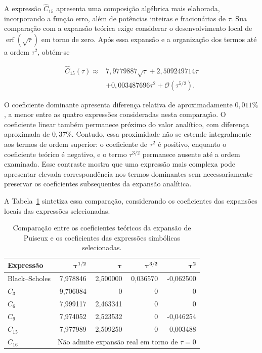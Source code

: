 A expressão $\widehat{C}_{15}$ apresenta uma composição algébrica mais elaborada, incorporando a função erro, além de potências inteiras e fracionárias de $\tau$. Sua comparação com a expansão teórica exige considerar o desenvolvimento local de $\operatorname{erf}(\sqrt{\tau})$ em torno de zero. Após essa expansão e a organização dos termos até a ordem $\tau^2$, obtém-se

\begin{equation}
\begin{aligned}
\widehat{C}_{15}(\tau)\approx{}&
7{,}9779887\sqrt{\tau}
+2{,}509249714\tau\\
&+0{,}003487696\tau^2
+\mathcal{O}(\tau^{5/2}).
\end{aligned}
\end{equation}

O coeficiente dominante apresenta diferença relativa de aproximadamente $0{,}011\%$, a menor entre as quatro expressões consideradas nesta comparação. O coeficiente linear também permanece próximo do valor analítico, com diferença aproximada de $0{,}37\%$. Contudo, essa proximidade não se estende integralmente aos termos de ordem superior: o coeficiente de $\tau^2$ é positivo, enquanto o coeficiente teórico é negativo, e o termo $\tau^{3/2}$ permanece ausente até a ordem examinada. Esse contraste mostra que uma expressão mais complexa pode apresentar elevada correspondência nos termos dominantes sem necessariamente preservar os coeficientes subsequentes da expansão analítica.

A Tabela~\ref{tab} sintetiza essa comparação, considerando os coeficientes das expansões locais das expressões selecionadas.

\begin{table}[htbp]
\centering
\caption{Comparação entre os coeficientes teóricos da expansão de Puiseux e os coeficientes das expressões simbólicas selecionadas.}
\label{tab}
\small
\begin{tabular}{lrrrr}
\hline
\textbf{Expressão} &
$\boldsymbol{\tau^{1/2}}$ &
$\boldsymbol{\tau}$ &
$\boldsymbol{\tau^{3/2}}$ &
$\boldsymbol{\tau^2}$ \\
\hline
Black--Scholes & 7,978846 & 2,500000 & 0,036570 & -0,062500 \\
$\widehat{C}_3$ & 9,706084 & 0 & 0 & 0 \\
$\widehat{C}_6$ & 7,999117 & 2,463341 & 0 & 0 \\
$\widehat{C}_9$ & 7,974052 & 2,523532 & 0 & -0,046254 \\
$\widehat{C}_{15}$ & 7,977989 & 2,509250 & 0 & 0,003488 \\
$\widehat{C}_{16}$ & \multicolumn{4}{c}{Não admite expansão real em torno de $\tau=0$} \\
\hline
\end{tabular}
\end{table}

